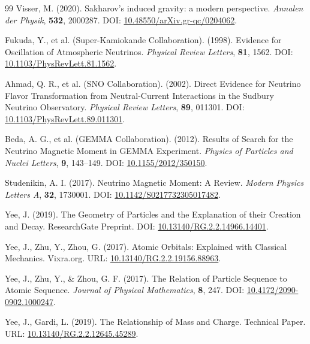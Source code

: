 \documentclass[10pt,a4paper]{article}
\begin{document}
\begin{thebibliography}{99}
	Visser, M. (2020).
	Sakharov's induced gravity: a modern perspective.
	\textit{Annalen der Physik}, \textbf{532}, 2000287.
	DOI: \href{https://doi.org/10.48550/arXiv.gr-qc/0204062}{10.48550/arXiv.gr-qc/0204062}.
	
	Fukuda, Y., et al. (Super-Kamiokande Collaboration). (1998).
	Evidence for Oscillation of Atmospheric Neutrinos.
	\textit{Physical Review Letters}, \textbf{81}, 1562.
	DOI: \href{https://doi.org/10.1103/PhysRevLett.81.1562}{10.1103/PhysRevLett.81.1562}.
	
	Ahmad, Q. R., et al. (SNO Collaboration). (2002).
	Direct Evidence for Neutrino Flavor Transformation from Neutral-Current Interactions in the Sudbury Neutrino Observatory.
	\textit{Physical Review Letters}, \textbf{89}, 011301.
	DOI: \href{https://doi.org/10.1103/PhysRevLett.89.011301}{10.1103/PhysRevLett.89.011301}.
	
	Beda, A. G., et al. (GEMMA Collaboration). (2012).
	Results of Search for the Neutrino Magnetic Moment in GEMMA Experiment.
	\textit{Physics of Particles and Nuclei Letters}, \textbf{9}, 143--149.
	DOI: \href{https://doi.org/10.1155/2012/350150}{10.1155/2012/350150}.
	
	Studenikin, A. I. (2017).
	Neutrino Magnetic Moment: A Review.
	\textit{Modern Physics Letters A}, \textbf{32}, 1730001.
	DOI: \href{https://doi.org/10.1142/S0217732305017482}{10.1142/S0217732305017482}.
	
	Yee, J. (2019).
	The Geometry of Particles and the Explanation of their Creation and Decay.
	ResearchGate Preprint.
	DOI: \href{https://doi.org/10.13140/RG.2.2.14966.14401}{10.13140/RG.2.2.14966.14401}.
	
	Yee, J., Zhu, Y., Zhou, G. (2017).
	Atomic Orbitals: Explained with Classical Mechanics.
	Vixra.org.
	URL: \href{https://doi.org/10.13140/RG.2.2.19156.88963}{10.13140/RG.2.2.19156.88963}.
	
	Yee, J., Zhu, Y., \& Zhou, G. F. (2017).
	The Relation of Particle Sequence to Atomic Sequence.
	\textit{Journal of Physical Mathematics}, \textbf{8}, 247.
	DOI: \href{https://doi.org/10.4172/2090-0902.1000247}{10.4172/2090-0902.1000247}.
	
	Yee, J., Gardi, L. (2019).
	The Relationship of Mass and Charge.
	Technical Paper.
	URL: \href{https://doi.org/10.13140/RG.2.2.12645.45289}{10.13140/RG.2.2.12645.45289}.
		

\end{thebibliography}
\end{document}
